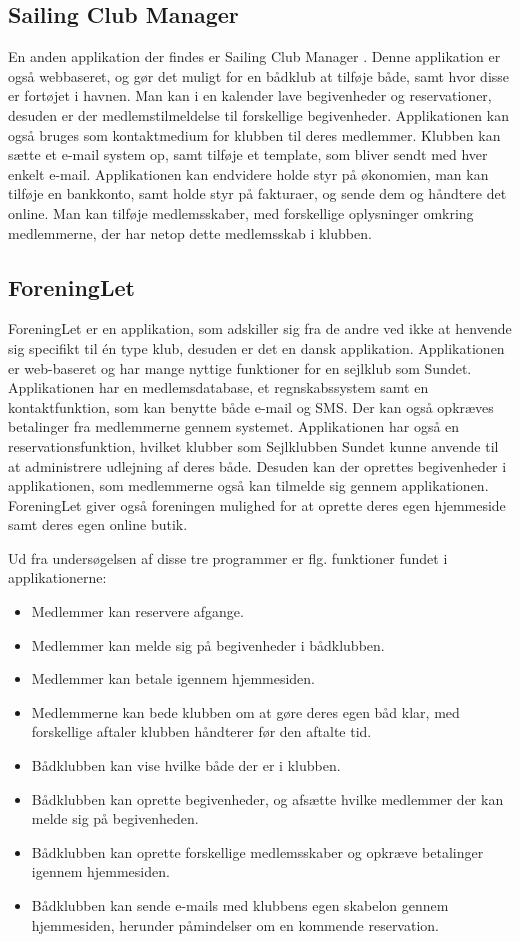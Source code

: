 \subsection*{Sailing Club Manager}

En anden applikation der findes er Sailing Club Manager \citep{SailClub}. 
Denne applikation er også webbaseret, og gør det muligt for en bådklub at tilføje både, samt hvor disse er fortøjet i havnen. 
Man kan i en kalender lave begivenheder og reservationer, desuden er der medlemstilmeldelse til forskellige begivenheder. Applikationen kan også bruges som kontaktmedium for klubben til deres medlemmer. 
Klubben kan sætte et e-mail system op, samt tilføje et template, som bliver sendt med hver enkelt e-mail.
Applikationen kan endvidere holde styr på økonomien, man kan tilføje en bankkonto, samt holde styr på fakturaer, og sende dem og håndtere det online. 
Man kan tilføje medlemsskaber, med forskellige oplysninger omkring medlemmerne, der har netop dette medlemsskab i klubben.

\subsection*{ForeningLet}

ForeningLet er en applikation, som adskiller sig fra de andre ved ikke at henvende sig specifikt til én type klub, desuden er det en dansk applikation. 
Applikationen er web-baseret og har mange nyttige funktioner for en sejlklub som Sundet. 
Applikationen har en medlemsdatabase, et regnskabssystem samt en kontaktfunktion, som kan benytte både e-mail og SMS. 
Der kan også opkræves betalinger fra medlemmerne gennem systemet. 
Applikationen har også en reservationsfunktion, hvilket klubber som Sejlklubben Sundet kunne anvende til at administrere udlejning af deres både. 
Desuden kan der oprettes begivenheder i applikationen, som medlemmerne også kan tilmelde sig gennem applikationen. ForeningLet giver også foreningen mulighed for at oprette deres egen hjemmeside samt deres egen online butik. 

Ud fra undersøgelsen af disse tre programmer er flg. funktioner fundet i applikationerne:

\begin{itemize}
  \item Medlemmer kan reservere afgange.
  \item Medlemmer kan melde sig på begivenheder i bådklubben.
  \item Medlemmer kan betale igennem hjemmesiden.
  \item Medlemmerne kan bede klubben om at gøre deres egen båd klar, med forskellige aftaler klubben håndterer
        før den aftalte tid.
  \item Bådklubben kan vise hvilke både der er i klubben.
  \item Bådklubben kan oprette begivenheder, og afsætte hvilke medlemmer der kan melde sig på begivenheden.
  \item Bådklubben kan oprette forskellige medlemsskaber og opkræve betalinger igennem hjemmesiden.
  \item Bådklubben kan sende e-mails med klubbens egen skabelon gennem hjemmesiden, herunder påmindelser om en
        kommende reservation.
\end{itemize}
